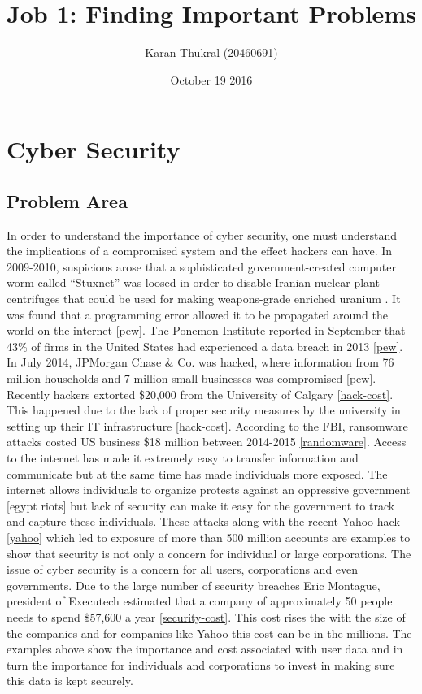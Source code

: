 \documentclass{article}
\title{Job 1: Finding Important Problems}
\author{Karan Thukral (20460691)}
\date{October 19 2016}
\begin{document}
\maketitle

\section{Cyber Security}
\subsection{Problem Area}
In order to understand the importance of cyber security, one must understand the implications of a compromised system and the effect hackers can have. In 2009-2010, suspicions arose that a sophisticated government-created computer worm called “Stuxnet” was loosed in order to disable Iranian nuclear plant centrifuges that could be used for making weapons-grade enriched uranium . It was found that a programming error allowed it to be propagated around the world on the internet \ref{pew}. The Ponemon Institute reported in September that 43\% of firms in the United States had experienced a data breach in 2013 \ref{pew}. In July 2014, JPMorgan Chase \& Co. was hacked, where information from 76 million households and 7 million small businesses was compromised \ref{pew}. Recently hackers extorted \$20,000 from the University of Calgary \ref{hack-cost}. This happened due to the lack of proper security measures by the university in setting up their IT infrastructure \ref{hack-cost}. According to the FBI, ransomware attacks costed US business \$18 million between 2014-2015 \ref{randomware}. Access to the internet has made it extremely easy to transfer information and communicate but at the same time has made individuals more exposed. The internet allows individuals to organize protests against an oppressive government [egypt riots] but lack of security can make it easy for the government to track and capture these individuals. These attacks along with the recent Yahoo hack \ref{yahoo} which led to exposure of more than 500 million accounts are examples to show that security is not only a concern for individual or large corporations. The issue of cyber security is a concern for all users, corporations and even governments.  Due to the large number of security breaches Eric Montague, president of Executech estimated that a company of approximately 50 people needs to spend \$57,600 a year \ref{security-cost}. This cost rises the with the size of the companies and for companies like Yahoo this cost can be in the millions. The examples above show the importance and cost associated with user data and in turn the importance for individuals and corporations to invest in making sure this data is kept securely.
\end{document}
